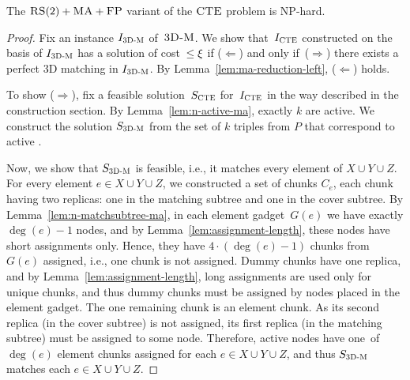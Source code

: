 \begin{theorem}
  The $\textsc{RS}(2)+\textsc{MA}+\textsc{FP}$ variant of the $\textsc{CTE}$ problem is NP-hard.
  \label{th:ma-reduction}
\end{theorem}

\begin{proof}
  
  Fix an instance $I_{\mathrm{\textsc{3D-M}}}$ of~$\textsc{3D-M}$.
  We show that~$I_{\mathrm{\textsc{CTE}}}$ constructed on the basis of $I_{\mathrm{\textsc{3D-M}}}$ has a solution of cost~$\leq \xi$ if ($\Leftarrow$) and only if~($\Rightarrow$) there exists a perfect 3D matching in $I_{\mathrm{\textsc{3D-M}}}$.
  By Lemma~\ref{lem:ma-reduction-left}, ($\Leftarrow$) holds.

  To show ($\Rightarrow$), fix a feasible solution~$S_{\mathrm{\textsc{CTE}}}$ for~$I_{\mathrm{\textsc{CTE}}}$ in the way described in the construction section.
  By Lemma~\ref{lem:n-active-ma}, exactly $k$ \TripleGadgets{} are active.
  We construct the solution $S_{\mathrm{\textsc{3D-M}}}$ from the set of $k$ triples from $P$ that correspond to active \TripleGadgets{}.

  Now, we show that $S_{\mathrm{\textsc{3D-M}}}$ is feasible, i.e., it matches every element of $X\cup Y\cup Z$.
  For every element $e\in X\cup Y \cup Z$, we constructed a set of chunks $C_e$, each chunk having two replicas: one in the matching subtree and one in the cover subtree.
  By Lemma~\ref{lem:n-matchsubtree-ma}, in each element gadget~$G(e)$ we have exactly $\deg(e) - 1$ nodes, and by Lemma~\ref{lem:assignment-length}, these nodes have short assignments only.
  Hence, they have $4 \cdot (\deg(e) - 1)$ chunks from $G(e)$ assigned, i.e., one chunk is not assigned.
  Dummy chunks have one replica, and by Lemma~\ref{lem:assignment-length}, long assignments are used only for unique chunks, and thus dummy chunks must be assigned by nodes placed in the element gadget.
  The one remaining chunk is an element chunk.
  As its second replica (in the cover subtree) is not assigned, its first replica (in the matching subtree) must be assigned to some node.
  Therefore, active nodes have one~of $\deg(e)$ element chunks assigned for each $e\in X\cup Y\cup Z$, and thus $S_{\mathrm{\textsc{3D-M}}}$ matches each $e\in X\cup Y\cup Z$.
\end{proof}



